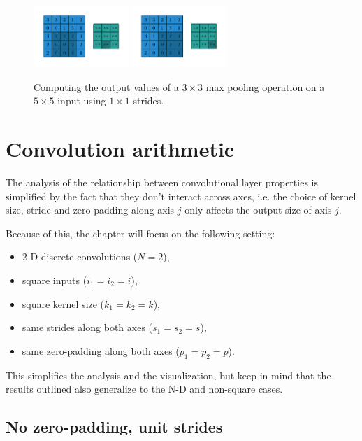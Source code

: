 \documentclass{report}
\begin{document}
\begin{figure}[p]
    \includegraphics[width=0.32\textwidth]{pdf/numerical_max_pooling_07.pdf}
    \includegraphics[width=0.32\textwidth]{pdf/numerical_max_pooling_08.pdf}
    \caption{\label{fig:numerical_max_pooling} Computing the output values of a
        $3 \times 3$ max pooling operation on a $5 \times 5$ input using $1
        \times 1$ strides.}
\end{figure}

\chapter{Convolution arithmetic}

The analysis of the relationship between convolutional layer properties is
simplified by the fact that they don't interact across axes, i.e. the choice of
kernel size, stride and zero padding along axis $j$ only affects the output size
of axis $j$.

Because of this, the chapter will focus on the following setting:

\begin{itemize}
    \item 2-D discrete convolutions ($N = 2$),
    \item square inputs ($i_1 = i_2 = i$),
    \item square kernel size ($k_1 = k_2 = k$),
    \item same strides along both axes ($s_1 = s_2 = s$),
    \item same zero-padding along both axes ($p_1 = p_2 = p$).
\end{itemize}

This simplifies the analysis and the visualization, but keep in mind that the
results outlined also generalize to the N-D and non-square cases.

\section{No zero-padding, unit strides}
\end{document}
